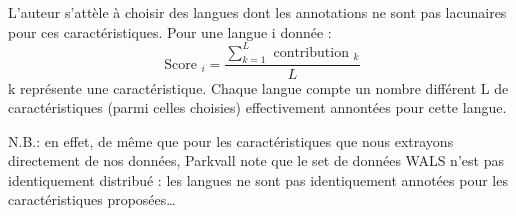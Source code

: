\documentclass[a4paper, twoside]{article}
\begin{document}
    L’auteur s’attèle à choisir des langues dont les annotations ne sont pas lacunaires pour ces caractéristiques. Pour une langue i donnée :
    \begin{equation}
    \text { Score }_{i}=\frac{\sum_{k=1}^{L} \text { contribution }_{k}}{L}
    \end{equation}
    k représente une caractéristique. Chaque langue compte un nombre différent L de caractéristiques (parmi celles choisies) effectivement annontées pour cette langue. \par
    N.B.: en effet, de même que pour les caractéristiques que nous extrayons directement de nos données, Parkvall note que le set de données WALS n’est pas identiquement distribué : les langues ne sont pas identiquement annotées pour les caractéristiques proposées…
\end{document}
